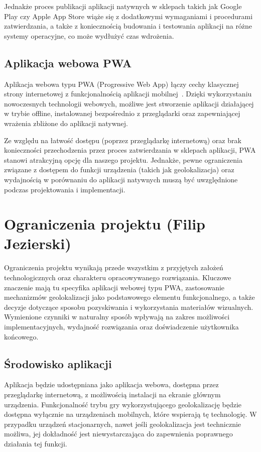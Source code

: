 Jednakże proces publikacji aplikacji natywnych w sklepach takich jak Google Play czy Apple App Store wiąże się z dodatkowymi wymaganiami i procedurami zatwierdzania, a także z koniecznością budowania i testowania aplikacji na różne systemy operacyjne, co może wydłużyć czas wdrożenia.

\subsection{Aplikacja webowa PWA}
Aplikacja webowa typu PWA (Progressive Web App) łączy cechy klasycznej strony internetowej z funkcjonalnością aplikacji mobilnej~\cite{pwa-docs}. Dzięki wykorzystaniu nowoczesnych technologii webowych, możliwe jest stworzenie aplikacji działającej w trybie offline, instalowanej bezpośrednio z przeglądarki oraz zapewniającej wrażenia zbliżone do aplikacji natywnej.

Ze względu na łatwość dostępu (poprzez przeglądarkę internetową) oraz brak konieczności przechodzenia przez proces zatwierdzania w sklepach aplikacji, PWA stanowi atrakcyjną opcję dla naszego projektu. Jednakże, pewne ograniczenia związane z dostępem do funkcji urządzenia (takich jak geolokalizacja) oraz wydajnością w porównaniu do aplikacji natywnych muszą być uwzględnione podczas projektowania i implementacji.

\section{Ograniczenia projektu (Filip Jezierski)}
Ograniczenia projektu wynikają przede wszystkim z przyjętych założeń technologicznych oraz charakteru opracowywanego rozwiązania. Kluczowe znaczenie mają tu specyfika aplikacji webowej typu PWA, zastosowanie mechanizmów geolokalizacji jako podstawowego elementu funkcjonalnego, a także decyzje dotyczące sposobu pozyskiwania i wykorzystania materiałów wizualnych. Wymienione czynniki w naturalny sposób wpływają na zakres możliwości implementacyjnych, wydajność rozwiązania oraz doświadczenie użytkownika końcowego.

\subsection{Środowisko aplikacji}
Aplikacja będzie udostępniana jako aplikacja webowa, dostępna przez przeglądarkę internetową, z możliwością instalacji na ekranie głównym urządzenia. Funkcjonalność trybu gry wykorzystującego geolokalizację będzie dostępna wyłącznie na urządzeniach mobilnych, które wspierają tę technologię. W przypadku urządzeń stacjonarnych, nawet jeśli geolokalizacja jest technicznie możliwa, jej dokładność jest niewystarczająca do zapewnienia poprawnego działania tej funkcji.

